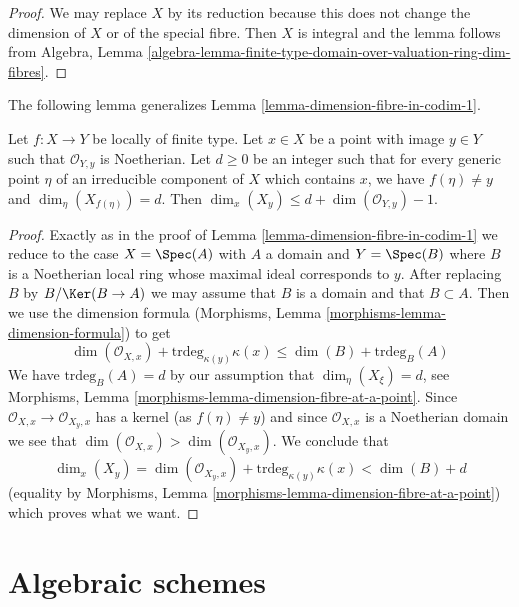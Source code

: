\begin{proof}
We may replace $X$ by its reduction because this does not change the
dimension of $X$ or of the special fibre. Then $X$ is integral and
the lemma follows from Algebra, Lemma
\ref{algebra-lemma-finite-type-domain-over-valuation-ring-dim-fibres}.
\end{proof}

\noindent
The following lemma generalizes Lemma \ref{lemma-dimension-fibre-in-codim-1}.

\begin{lemma}
\label{lemma-dimension-fibre-in-higher-codimension}
Let $f : X \to Y$ be locally of finite type. Let $x \in X$ be a point
with image $y \in Y$ such that $\mathcal{O}_{Y, y}$ is Noetherian. Let
$d \geq 0$ be an integer such that for every generic point $\eta$ of an
irreducible component of $X$ which contains $x$, we have
$f(\eta) \not = y$ and $\dim_\eta(X_{f(\eta)}) = d$. Then
$\dim_x(X_y) \leq d + \dim(\mathcal{O}_{Y, y}) - 1$.
\end{lemma}

\begin{proof}
Exactly as in the proof of Lemma \ref{lemma-dimension-fibre-in-codim-1}
we reduce to the case $X = \Spec(A)$ with $A$ a domain and $Y = \Spec(B)$
where $B$ is a Noetherian local ring whose maximal ideal corresponds to $y$.
After replacing $B$ by $B/\Ker(B \to A)$ we may assume that $B$
is a domain and that $B \subset A$.
Then we use the dimension formula
(Morphisms, Lemma \ref{morphisms-lemma-dimension-formula}) to get
$$
\dim(\mathcal{O}_{X, x}) + \text{trdeg}_{\kappa(y)} \kappa(x) \leq
\dim(B) + \text{trdeg}_B(A)
$$
We have $\text{trdeg}_B(A) = d$ by
our assumption that $\dim_\eta(X_\xi) = d$, see
Morphisms, Lemma \ref{morphisms-lemma-dimension-fibre-at-a-point}.
Since $\mathcal{O}_{X, x} \to \mathcal{O}_{X_y, x}$ has a kernel
(as $f(\eta) \not = y$) and since $\mathcal{O}_{X, x}$
is a Noetherian domain we see that
$\dim(\mathcal{O}_{X, x}) > \dim(\mathcal{O}_{X_y, x})$.
We conclude that
$$
\dim_x(X_y) =
\dim(\mathcal{O}_{X_y, x}) + \text{trdeg}_{\kappa(y)} \kappa(x)
< \dim(B) + d
$$
(equality by Morphisms, Lemma \ref{morphisms-lemma-dimension-fibre-at-a-point})
which proves what we want.
\end{proof}




\section{Algebraic schemes}
\label{section-algebraic-schemes}

